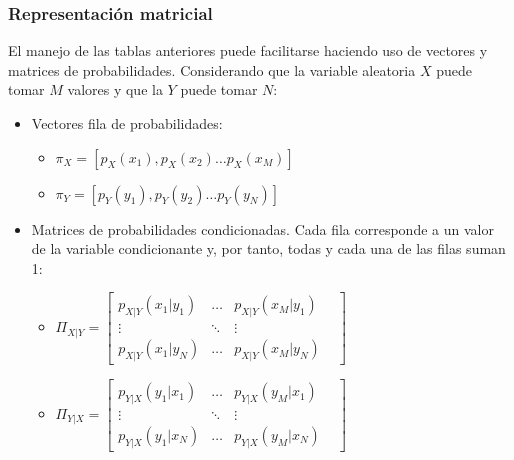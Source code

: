 \documentclass[11pt]{article}
\providecommand{\tightlist}{%
      \setlength{\itemsep}{0pt}\setlength{\parskip}{0pt}}
\begin{document}
    \hypertarget{representaciuxf3n-matricial}{%
\subsubsection{Representación
matricial}\label{representaciuxf3n-matricial}}

El manejo de las tablas anteriores puede facilitarse haciendo uso de
vectores y matrices de probabilidades. Considerando que la variable
aleatoria \(X\) puede tomar \(M\) valores y que la \(Y\) puede tomar
\(N\):

\begin{itemize}
\tightlist
\item
  Vectores fila de probabilidades:

  \begin{itemize}
  \tightlist
  \item
    \(\pi_X = [p_X(x_1), p_X(x_2) \ldots p_X(x_M)]\)
  \item
    \(\pi_Y = [p_Y(y_1), p_Y(y_2) \ldots p_Y(y_N)]\)
  \end{itemize}
\item
  Matrices de probabilidades condicionadas. Cada fila corresponde a un
  valor de la variable condicionante y, por tanto, todas y cada una de
  las filas suman 1:

  \begin{itemize}
  \tightlist
  \item
\(\Pi_{X | Y} = \begin{bmatrix}
  p_{X | Y}(x_1 | y_1) & \ldots & p_{X | Y}(x_M | y_1)\\
  \vdots & \ddots & \vdots\\
  p_{X | Y}(x_1 | y_N) & \ldots & p_{X | Y}(x_M | y_N) & 
 \end{bmatrix}\)

  \item
    \(  \Pi_{Y | X} = \begin{bmatrix}
  p_{Y | X}(y_1 | x_1) & \ldots & p_{Y | X}(y_M | x_1)\\
  \vdots & \ddots & \vdots\\
  p_{Y | X}(y_1 | x_N) & \ldots & p_{Y | X}(y_M | x_N) & 
 \end{bmatrix}\)
  \end{itemize}
\end{itemize}
\end{document}
